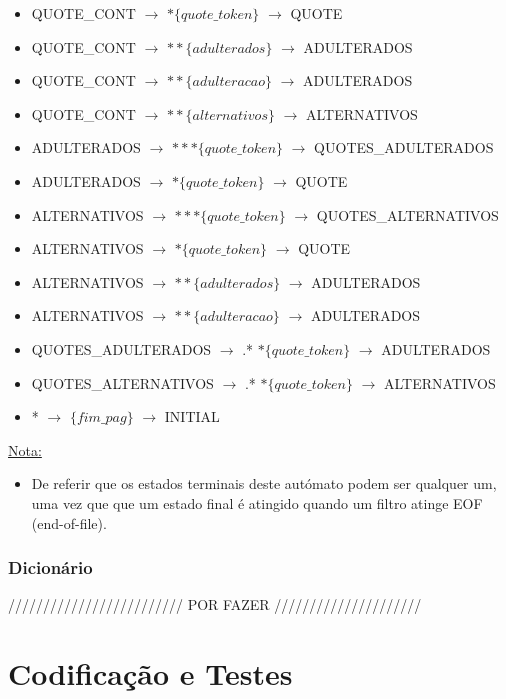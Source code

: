 \documentclass[11pt,a4paper]{report}
\begin{document}
\begin{itemize}
\begin{itemize}
			\item QUOTE\_CONT $\rightarrow$ $*\{quote\_token\}$ $\rightarrow$ QUOTE
			\item QUOTE\_CONT $\rightarrow$ $**\{adulterados\}$ $\rightarrow$ ADULTERADOS
			\item QUOTE\_CONT $\rightarrow$ $**\{adulteracao\}$ $\rightarrow$ ADULTERADOS
			\item QUOTE\_CONT $\rightarrow$ $**\{alternativos\}$ $\rightarrow$ ALTERNATIVOS
			\item ADULTERADOS $\rightarrow$ $***\{quote\_token\}$ $\rightarrow$ QUOTES\_ADULTERADOS
			\item ADULTERADOS $\rightarrow$ $*\{quote\_token\}$ $\rightarrow$ QUOTE
			\item ALTERNATIVOS $\rightarrow$ $***\{quote\_token\}$ $\rightarrow$ QUOTES\_ALTERNATIVOS
			\item ALTERNATIVOS $\rightarrow$ $*\{quote\_token\}$ $\rightarrow$ QUOTE
			\item ALTERNATIVOS $\rightarrow$ $**\{adulterados\}$ $\rightarrow$ ADULTERADOS
			\item ALTERNATIVOS $\rightarrow$ $**\{adulteracao\}$ $\rightarrow$ ADULTERADOS
			\item QUOTES\_ADULTERADOS $\rightarrow$ .* $*\{quote\_token\}$ $\rightarrow$ ADULTERADOS
			\item QUOTES\_ALTERNATIVOS $\rightarrow$ .* $*\{quote\_token\}$ $\rightarrow$ ALTERNATIVOS
			\item * $\rightarrow$ $\{fim\_pag\}$ $\rightarrow$ INITIAL
		\end{itemize}
\end{itemize}

\vspace{0.5cm}

\underline{Nota:}
\begin{itemize}
	\item De referir que os estados terminais deste autómato podem ser qualquer um, uma vez que que um estado final é atingido quando um filtro atinge EOF (end-of-file).
\end{itemize}

\subsection{Dicionário}
\label{sub:algoritmos4}

///////////////////////// POR FAZER /////////////////////


\chapter{Codificação e Testes}
\label{chap:codificacao}
\end{document}
